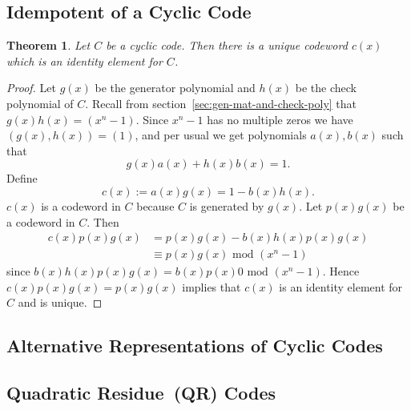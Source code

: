 \documentclass{article}
\renewcommand{\mod}{\text{ mod }}
\renewcommand{\=}{\equiv}
\theoremstyle{plain}
\newtheorem{thm}{Theorem}[subsection]
\theoremstyle{definition}
\begin{document}
\subsection{Idempotent of a Cyclic Code}

\begin{thm}
Let $C$ be a cyclic code.
Then there is a unique codeword $c(x)$ which is an identity element for $C$.
\end{thm}
\begin{proof}
Let $g(x)$ be the generator polynomial and $h(x)$ be the check polynomial of $C$.
Recall from section~\ref{sec:gen-mat-and-check-poly} that $g(x) h(x) = (x^n - 1)$.
Since $x^n - 1$ has no multiple zeros we have $(g(x), h(x)) = (1)$, and per usual we get
polynomials $a(x), b(x)$ such that
$$ g(x) a(x) + h(x) b(x) = 1. $$
Define
$$ c(x) := a(x) g(x) = 1 - b(x) h(x). $$
$c(x)$ is a codeword in $C$ because $C$ is generated by $g(x)$.
Let $p(x) g(x)$ be a codeword in $C$.
Then
\begin{align*}
c(x) p(x) g(x)
&= p(x) g(x) - b(x) h(x) p(x) g(x) \\
&\= p(x) g(x) \mod (x^n - 1)
\end{align*}
since $b(x) h(x) p(x) g(x) = b(x) p(x) 0 \mod (x^n - 1)$.
Hence $c(x) p(x) g(x) = p(x) g(x)$ implies that $c(x)$ is an identity element for $C$ and is unique.


\end{proof}


\subsection{Alternative Representations of Cyclic Codes}

\subsection{Quadratic Residue (QR) Codes}
\end{document}
